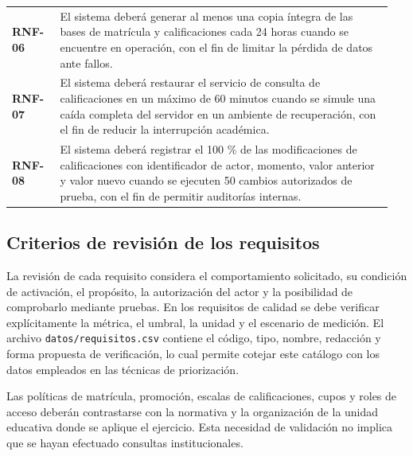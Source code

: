 \begin{longtable}{@{}p{0.12\linewidth}p{0.83\linewidth}@{}}
\textbf{RNF-06} & El sistema deberá generar al menos una copia íntegra de las bases de matrícula y calificaciones cada 24 horas cuando se encuentre en operación, con el fin de limitar la pérdida de datos ante fallos. \\
\textbf{RNF-07} & El sistema deberá restaurar el servicio de consulta de calificaciones en un máximo de 60 minutos cuando se simule una caída completa del servidor en un ambiente de recuperación, con el fin de reducir la interrupción académica. \\
\textbf{RNF-08} & El sistema deberá registrar el 100 \% de las modificaciones de calificaciones con identificador de actor, momento, valor anterior y valor nuevo cuando se ejecuten 50 cambios autorizados de prueba, con el fin de permitir auditorías internas. \\
\end{longtable}
\endgroup

\subsection{Criterios de revisión de los requisitos}

La revisión de cada requisito considera el comportamiento solicitado, su condición de activación, el propósito, la autorización del actor y la posibilidad de comprobarlo mediante pruebas. En los requisitos de calidad se debe verificar explícitamente la métrica, el umbral, la unidad y el escenario de medición. El archivo \texttt{datos/requisitos.csv} contiene el código, tipo, nombre, redacción y forma propuesta de verificación, lo cual permite cotejar este catálogo con los datos empleados en las técnicas de priorización.

Las políticas de matrícula, promoción, escalas de calificaciones, cupos y roles de acceso deberán contrastarse con la normativa y la organización de la unidad educativa donde se aplique el ejercicio. Esta necesidad de validación no implica que se hayan efectuado consultas institucionales.
